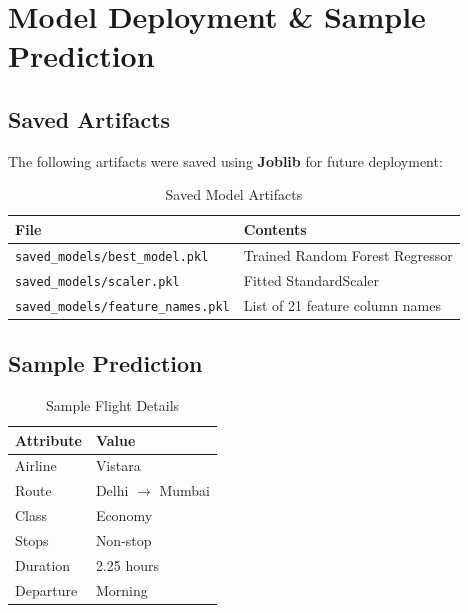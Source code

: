 \documentclass[12pt, a4paper]{article}
\begin{document}
\newpage

\section{Model Deployment \& Sample Prediction}

\subsection{Saved Artifacts}

The following artifacts were saved using \textbf{Joblib} for future deployment:

\begin{table}[H]
\centering
\caption{Saved Model Artifacts}
\begin{tabular}{l l}
\toprule
\textbf{File} & \textbf{Contents} \\
\midrule
\texttt{saved\_models/best\_model.pkl}    & Trained Random Forest Regressor \\
\texttt{saved\_models/scaler.pkl}          & Fitted StandardScaler \\
\texttt{saved\_models/feature\_names.pkl}  & List of 21 feature column names \\
\bottomrule
\end{tabular}
\end{table}

\subsection{Sample Prediction}

\begin{table}[H]
\centering
\caption{Sample Flight Details}
\begin{tabular}{l l}
\toprule
\textbf{Attribute} & \textbf{Value} \\
\midrule
Airline     & Vistara \\
Route       & Delhi $\rightarrow$ Mumbai \\
Class       & Economy \\
Stops       & Non-stop \\
Duration    & 2.25 hours \\
Departure   & Morning \\
\bottomrule
\end{tabular}
\end{table}
\end{document}
